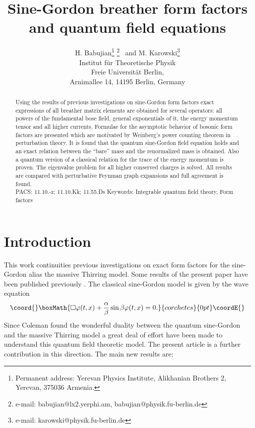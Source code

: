\documentclass[a4paper,a4paper]{article}
\begin{document}
\title{Sine-Gordon breather form factors\\
and quantum field equations}
\author{H. Babujian\thanks{%
Permanent address: Yerevan Physics Institute, Alikhanian Brothers 2,
Yerevan, 375036 Armenia.} \thanks{
e-mail: babujian@lx2.yerphi.am, babujian@physik.fu-berlin.de}~ and M.
Karowski\thanks{
e-mail: karowski@physik.fu-berlin.de} \\
Institut f\"ur Theoretische Physik\\
Freie Universit\"at Berlin,\\
Arnimallee 14, 14195 Berlin, Germany\\
}
\maketitle

\begin{abstract}
Using the results of previous investigations on sine-Gordon form factors
exact expressions of all breather matrix elements are obtained for several
operators: all powers of the fundamental bose field, general exponentials of
it, the energy momentum tensor and all higher currents. Formulae for the
asymptotic behavior of bosonic form factors are presented which are
motivated by Weinberg's power counting theorem in perturbation theory. It is
found that the quantum sine-Gordon field equation holds and an exact
relation between the ``bare'' mass and the renormalized mass is obtained.
Also a quantum version of a classical relation for the trace of the energy
momentum is proven. The eigenvalue problem for all higher conserved charges
is solved. All results are compared with perturbative Feynman graph
expansions and full agreement is found.\\[8pt]
PACS: 11.10.-z; 11.10.Kk; 11.55.Ds\newline
Keywords: Integrable quantum field theory, Form factors
\end{abstract}


\section{Introduction}

This work continuities previous investigations \cite{BFKZ,BK} on exact form
factors for the sine-Gordon alias the massive Thirring model. Some results
of the present paper have been published previously \cite{BK1}. The
classical sine-Gordon model is given by the wave equation 
\[\coord{}\boxMath{
\square \varphi (t,x)+\frac{\alpha }{\beta }\sin \beta \varphi (t,x)=0. 
}{corchetes}{0pt}\coordE{}\]
Since Coleman \cite{Co} found the wonderful duality between the quantum
sine-Gordon and the massive Thirring model a great deal of effort have been
made to understand this quantum field theoretic model. The present article
is a further contribution in this direction. The main new results are:
\end{document}
